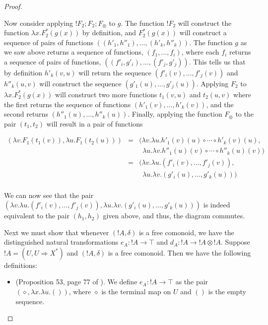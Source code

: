\begin{proof}
\begin{report}
\begin{center}
\begin{itemize}
      Now consider applying $!F_2;F_2;F_\otimes$ to $g$.  The function
      $!F_2$ will construct the function $\lambda x.F^*_2(g(x))$ by
      definition, and $F^*_2(g(x))$ will construct a sequence of pairs
      of functions $((h'_1,h''_1),\ldots,(h'_k,h''_k))$. The function
      $g$ as we saw above returns a sequence of functions,
      $(f_1,\ldots,f_i)$, where each $f_i$ returns a sequence of pairs
      of functions, $((f'_i,g'_i),\ldots,(f'_j,g'_j))$.  This tells us
      that by definition $h'_k(v,u)$ will return the sequence
      $(f'_i(v),\ldots,f'_j(v))$ and $h''_k(u,v)$ will construct the
      sequence $(g'_1(u),\ldots,g'_j(u))$.  Applying $F_2$ to $\lambda
      x.F^*_2(g(x))$ will construct two more functions $t_1(v,u)$ and
      $t_2(u,v)$ where the first returns the sequence of functions
      $(h'_1(v),\ldots,h'_k(v))$, and the second returns
      $(h''_1(u),\ldots,h''_k(u))$.  Finally, applying the function
      $F_\otimes$ to the pair $(t_1,t_2)$ will result in a pair of
      functions
      \begin{center}
        \begin{math}
          \begin{array}{lll}
            (\lambda v.F_1(t_1(v)),\lambda u.F_1(t_2(u)))
            & = & (\lambda v.\lambda u.h'_1(v)(u) \circ \cdots \circ h'_k(v)(u),\\
            &   & \,\,\,\lambda u.\lambda v.h''_1(u)(v) \circ \cdots \circ h''_k(u)(v))\\
            & = & (\lambda v.\lambda u.(f'_i(v),\ldots,f'_j(v)),\\
            &   & \,\,\,\lambda u.\lambda v.(g'_i(u), \ldots, g'_k(u)))\\
          \end{array}
        \end{math}
      \end{center} 
      We can now see that the pair
      $(\lambda v.\lambda u.(f'_i(v),\ldots,f'_j(v)),\lambda u.\lambda v.(g'_i(u), \ldots, g'_k(u)))$ is indeed
      equivalent to the pair $(h_1,h_2)$ given above, and thus, the diagram commutes.      
    \end{itemize}
  \end{center}
  Next we must show that whenever $(!A,\delta)$ is a free comonoid, we
  have the distinguished natural transformations $e_A : !A \to \top$
  and $d_A : !A \to !A \otimes !A$.  Suppose $!A = (U, U \Rightarrow
  X^*)$ and $(!A,\delta)$ is a free comonoid.  Then we have the
  following definitions:
  \begin{itemize}
  \item (Proposition 53, page 77 of \cite{dePaiva:1988}).  We define
    $e_A : !A \to \top$ as the pair $(\diamond,\lambda x.\lambda
    u.())$, where $\diamond$ is the terminal map on $U$ and $()$ is
    the empty sequence.
    

\end{itemize}
\end{report}
\end{proof}
